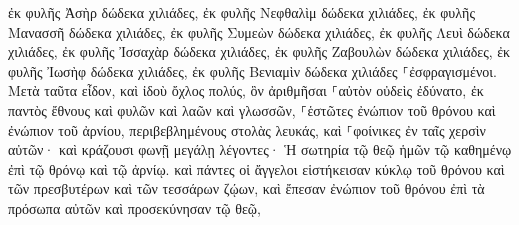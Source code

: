 \documentclass{openreader}
\begin{document}
ἐκ φυλῆς Ἀσὴρ δώδεκα χιλιάδες, ἐκ φυλῆς Νεφθαλὶμ δώδεκα χιλιάδες, ἐκ φυλῆς Μανασσῆ δώδεκα χιλιάδες, 
ἐκ φυλῆς Συμεὼν δώδεκα χιλιάδες, ἐκ φυλῆς Λευὶ δώδεκα χιλιάδες, ἐκ φυλῆς Ἰσσαχὰρ δώδεκα χιλιάδες, 
ἐκ φυλῆς Ζαβουλὼν δώδεκα χιλιάδες, ἐκ φυλῆς Ἰωσὴφ δώδεκα χιλιάδες, ἐκ φυλῆς Βενιαμὶν δώδεκα χιλιάδες ⸀ἐσφραγισμένοι. 
Μετὰ ταῦτα εἶδον, καὶ ἰδοὺ ὄχλος πολύς, ὃν ἀριθμῆσαι ⸀αὐτὸν οὐδεὶς ἐδύνατο, ἐκ παντὸς ἔθνους καὶ φυλῶν καὶ λαῶν καὶ γλωσσῶν, ⸀ἑστῶτες ἐνώπιον τοῦ θρόνου καὶ ἐνώπιον τοῦ ἀρνίου, περιβεβλημένους στολὰς λευκάς, καὶ ⸀φοίνικες ἐν ταῖς χερσὶν αὐτῶν· 
καὶ κράζουσι φωνῇ μεγάλῃ λέγοντες· Ἡ σωτηρία τῷ θεῷ ἡμῶν τῷ καθημένῳ ἐπὶ τῷ θρόνῳ καὶ τῷ ἀρνίῳ. 
καὶ πάντες οἱ ἄγγελοι εἱστήκεισαν κύκλῳ τοῦ θρόνου καὶ τῶν πρεσβυτέρων καὶ τῶν τεσσάρων ζῴων, καὶ ἔπεσαν ἐνώπιον τοῦ θρόνου ἐπὶ τὰ πρόσωπα αὐτῶν καὶ προσεκύνησαν τῷ θεῷ, 
\end{document}
